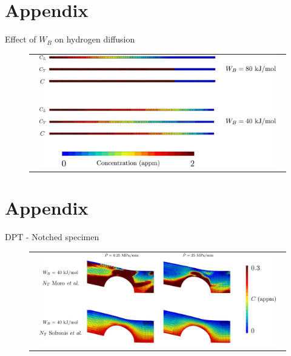 \documentclass[9pt]{beamer}
\begin{document}

\section*{Appendix}

\begin{frame}[noframenumbering]{Effect of $W_B$ on hydrogen diffusion}

	\begin{figure}
        \begin{tabular}{c}
            \includegraphics[width=0.95\textwidth]{Images/permeation_WB.pdf}
        \end{tabular}
    \end{figure}

\end{frame}


\section*{Appendix}

\begin{frame}[noframenumbering]{DPT - Notched specimen}

	\begin{figure}
        \begin{tabular}{c}
            \includegraphics[width=0.95\textwidth]{Images/03_C_scale.pdf}
        \end{tabular}
    \end{figure}

\end{frame}
\end{document}
